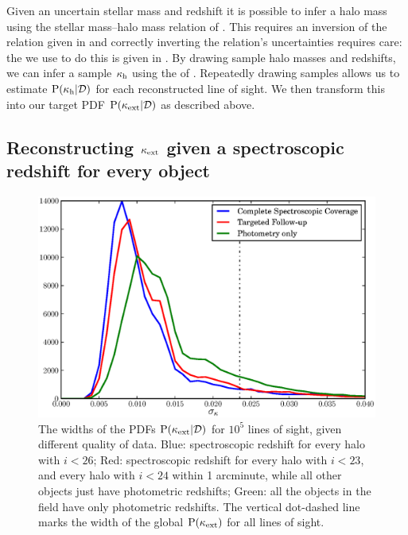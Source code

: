 \documentclass[useAMS,usenatbib,a4paper]{mn2e}
\begin{document}

Given an uncertain stellar mass and redshift it is possible to infer a
halo mass using the stellar mass--halo mass relation of
\citet{BehrooziEtal2010}. This \proceedure requires an inversion of the
relation given in \citet{BehrooziEtal2010} and correctly inverting the
relation's uncertainties requires care: the \proceedure we use to do this
is given in . By drawing sample halo masses
and redshifts, we can infer a sample $\kappa_{\rm h}$ using the \proceedure of
. Repeatedly drawing samples allows us to
estimate ${\rm P}(\kappa_{\rm h}|{\mathcal{D}})$ for each reconstructed line of sight. We then
transform this into our target PDF ${\rm P}(\kappa_{\rm ext}|{\mathcal{D}})$ as described above.



\subsection{Reconstructing $\kappa_{\rm ext}$ given a spectroscopic redshift for every object}

\begin{figure}
\includegraphics[width=\columnwidth]{figs/Width.eps}
\caption{The widths of the \infered PDFs ${\rm P}(\kappa_{\rm ext}|{\mathcal{D}})$ for
$10^5$ lines of sight, given different quality of data. 
Blue: spectroscopic redshift for every halo with $i<26$; 
Red: spectroscopic redshift for every halo with $i<23$, 
and every halo with $i<24$ within 1 arcminute, while all other objects just
have photometric redshifts;
Green: all the objects in the field have only photometric redshifts. The
vertical dot-dashed line marks the width of the global ${\rm P}(\kappa_{\rm ext})$ for all
lines of sight.}
\label{fig:reconwidths}
\end{figure}
\end{document}
